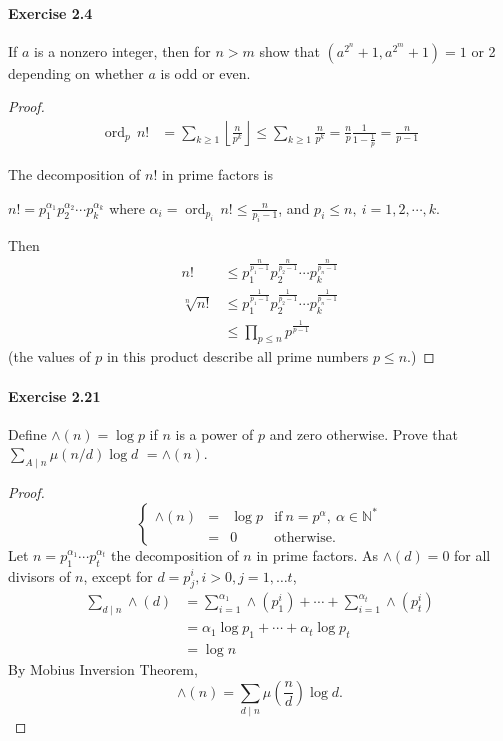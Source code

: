 \documentclass{article}
\begin{document}
\paragraph{Exercise 2.4} If $a$ is a nonzero integer, then for $n>m$ show that $\left(a^{2^{n}}+1, a^{2^{m}}+1\right)=1$ or 2 depending on whether $a$ is odd or even.
\begin{proof}    
\begin{align*}
\operatorname{ord}_p\, n!  &= \sum_{k\geq 1} \left \lfloor \frac{n}{p^{k}}\right \rfloor \leq  \sum_{k\geq 1}  \frac{n}{p^{k}} = \frac{n}{p} \frac{1}{1 - \frac{1}{p}} = \frac{n}{p-1}
\end{align*}

The decomposition of $n!$ in prime factors is

$n! = p_1^{\alpha_1}p_2^{\alpha_2}\cdots p_k^{\alpha_k}$ 
where $\alpha_i = \operatorname{ord}_{p_i}\, n! \leq \frac{n}{p_i-1}$, and $p_i \leq n, \ i=1,2,\cdots,k$.

Then
\begin{align*}
n! &\leq p_1^{\frac{n}{p_1-1}}p_2^{\frac{n}{p_2-1}}\cdots p_k^{\frac{n}{p_n-1}}\\
\sqrt[n]{n!} &\leq p_1^{\frac{1}{p_1-1}}p_2^{\frac{1}{p_2-1}}\cdots p_k^{\frac{1}{p_n-1}}\\
&\leq \prod_{p\leq n} p^{\frac{1}{p-1}}
\end{align*}
(the values of $p$ in this product describe all prime numbers $p\leq n$.)
\end{proof}



\paragraph{Exercise 2.21} Define $\wedge(n)=\log p$ if $n$ is a power of $p$ and zero otherwise. Prove that $\sum_{A \mid n} \mu(n / d) \log d$ $=\wedge(n)$.
\begin{proof}    
$$
\left\{
\begin{array}{cccl}
    \land(n)& =  & \log p & \mathrm{if}\  n =p^\alpha,\ \alpha \in \mathbb{N}^*  \\
  &  = &   0 & \mathrm{otherwise }.
\end{array}
\right.
$$
Let $n = p_1^{\alpha_1}\cdots p_t^{\alpha_t}$ the decomposition of $n$ in prime factors. As $\land(d) = 0$ for all divisors of $n$, except for $d = p_j^i, i>0, j=1,\ldots t$,
\begin{align*}
\sum_{d \mid n} \land(d)&= \sum_{i=1}^{\alpha_1} \land(p_1^{i}) + \cdots+ \sum_{i=1}^{\alpha_t} \land(p_t^{i})\\ 
&= \alpha_1 \log p_1+\cdots + \alpha_t \log p_t\\
&= \log n
\end{align*}
By Mobius Inversion Theorem,
$$\land(n) = \sum_{d \mid n} \mu\left (\frac{n}{d}\right ) \log d.$$
\end{proof}
\end{document}
